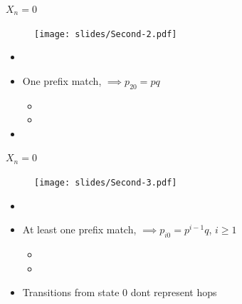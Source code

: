\documentclass[xcolor=pdftex,dvipsnames,table]{beamer}
\begin{document}
\begin{frame}
\begin{block}{$X_n = 0$}
\begin{center}
    \begin{figure}%
        \texttt{[image: slides/Second-2.pdf]}
    \end{figure}
\end{center}
\end{block}

\begin{block}{}
   \begin{itemize}
            \item[] %
            \item One prefix match, $\implies p_{20} = pq$ %
                 \begin{itemize}
                    \item[] %
                    \item[]
                 \end{itemize}
            \item[] %
    \end{itemize}
\end{block}
\end{frame}


\begin{frame}
\begin{block}{$X_n = 0$}
\begin{center}
    \begin{figure}%
        \texttt{[image: slides/Second-3.pdf]}
    \end{figure}
\end{center}
\end{block}

\begin{block}{}
   \begin{itemize}
            \item[] %
            \item At least one prefix match, $\implies p_{i0} = p^{i-1}q$, $i\ge 1$ %
                 \begin{itemize}
                    \item[] %
                    \item[]
                 \end{itemize}
            \item Transitions from state $0$ dont represent hops
    \end{itemize}
\end{block}
\end{frame}
\end{document}
